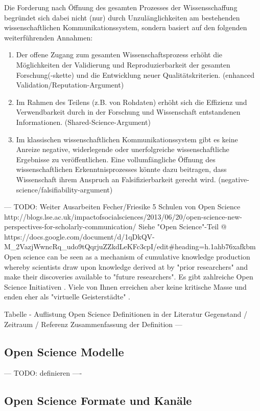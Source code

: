 Die Forderung nach Öffnung des gesamten Prozesses der Wissensschaffung begründet sich dabei nicht (nur) durch Unzulänglichkeiten am bestehenden wissenschaftlichen Kommunikationssystem, sondern basiert auf den folgenden weiterführenden Annahmen:
\begin{enumerate}
\item Der offene Zugang zum gesamten Wissenschaftsprozess erhöht die Möglichkeiten der Validierung und Reproduzierbarkeit der gesamten Forschung(-skette) und die Entwicklung neuer Qualitätskriterien. (enhanced Validation/Reputation-Argument)
\item Im Rahmen des Teilens (z.B. von Rohdaten) erhöht sich die Effizienz und Verwendbarkeit durch in der Forschung und Wissenschaft entstandenen Informationen. (Shared-Science-Argument)
\item Im klassischen wissenschaftlichen Kommunikationssystem gibt es keine Anreize negative, widerlegende oder unerfolgreiche wissenschaftliche Ergebnisse zu veröffentlichen. Eine vollumfängliche Öffnung des wissenschaftlichen Erkenntnisprozesses könnte dazu beitragen, dass Wissenschaft ihrem Anspruch an Falsifizierbarkeit gerecht wird. (negative-science/falsifiability-argument)
\end{enumerate}

--- TODO: Weiter Ausarbeiten
Fecher/Friesike 5 Schulen von Open Science http://blogs.lse.ac.uk/impactofsocialsciences/2013/06/20/open-science-new-perspectives-for-scholarly-communication/
Siehe "Open Science"-Teil @ https://docs.google.com/document/d/1qDkQV-M_2VazjWwncRq_udo9tQqrjuZZkdLeKFc3cpI/edit#heading=h.1ahb76xafkbm
Open science can be seen as a mechanism of cumulative knowledge production whereby scientists draw upon knowledge derived at by "prior researchers" and make their discoveries available to "future researchers". \cite{Mukherjee_2009}
Es gibt zahlreiche Open Science Initiativen \cite{Scheliga_2014}. Viele von Ihnen erreichen aber keine kritische Masse \cite{wrap_2010} und enden eher als "virtuelle Geisterstädte" \cite{Nielsen_2011}.

Tabelle - Auflistung Open Science Definitionen in der Literatur
Gegenstand / Zeitraum / Referenz
Zusammenfassung der Definition ---

\subsection{Open Science Modelle}
--- TODO: definieren ----

\subsection{Open Science Formate und Kanäle}

